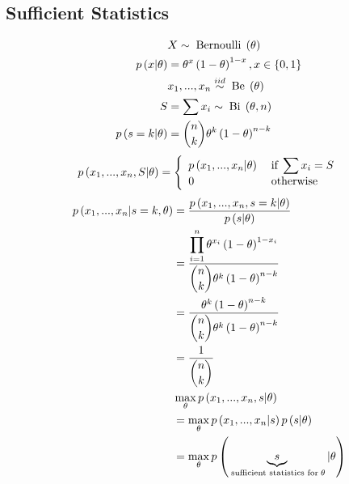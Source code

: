 \documentclass{article}
\begin{document}
\subsection{Sufficient Statistics}
\begin{align*}
&  X  \sim  \text{\;Bernoulli\;}\left(\theta\right)
\\ p\left(x | \theta\right)  &= \theta^{x} \left(1 - \theta\right)^{1 - x}, x \in \left\{0, 1\right\}
\\ &  x_{1}, ..., x_{n} \stackrel{iid}{\sim} \text{\;Be\;}\left(\theta\right)
\\ S  &= \displaystyle\sum x_{i} \sim  \text{\;Bi\;}\left(\theta, n\right)
\\ p\left(s = k | \theta\right)  &= \dbinom{n}{k} \theta^{k} \left(1 - \theta\right)^{n - k}
\end{align*}
\[ p\left(x_{1}, ..., x_{n}, S | \theta\right) =\left\{ \begin{array}{ll}
p\left(x_{1}, ..., x_{n} | \theta\right)& \text{\;if\;} \displaystyle\sum x_{i} = S  \\
0& \text{\;otherwise\;} \\
\end{array}\right. \]
\begin{align*}
p\left(x_{1}, ..., x_{n} | s = k, \theta\right)  &= \dfrac{p\left(x_{1}, ..., x_{n}, s = k | \theta\right)}{p\left(s | \theta\right)}
\\ &= \dfrac{\displaystyle\prod_{i=1}^{n} \theta^{x_{i}} \left(1 - \theta\right)^{1 - x_{i}}}{\dbinom{n}{k} \theta^{k} \left(1 - \theta\right)^{n-k}}
\\ &= \dfrac{\theta^{k} \left(1 - \theta\right)^{n-k}}{\dbinom{n}{k} \theta^{k} \left(1 - \theta\right)^{n-k}}
\\ &= \dfrac{1}{\dbinom{n}{k}}
\\ &  \displaystyle\max_{\theta} p\left(x_{1}, ..., x_{n}, s | \theta\right)
\\ &= \displaystyle\max_{\theta} p\left(x_{1}, ..., x_{n} | s\right) p\left(s | \theta\right)
\\ &= \displaystyle\max_{\theta} p\left(\underbrace{s}_{\text{\;sufficient statistics for\;} \theta} | \theta\right)
\end{align*}
\end{document}
